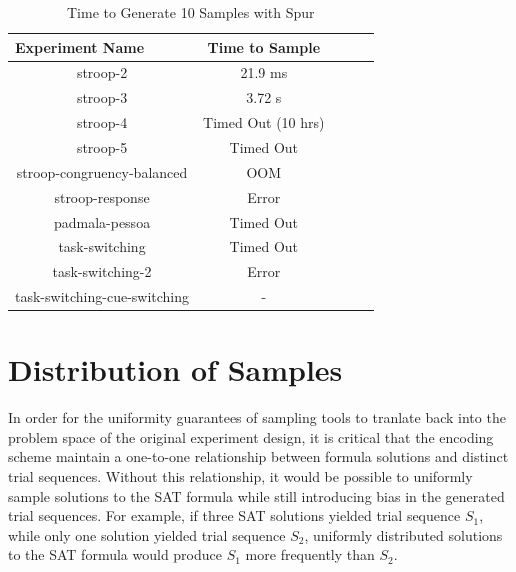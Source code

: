 

\begin{table}
  \centering
  \caption{Time to Generate 10 Samples with Spur}
\begin{tabular}{|c|c|c|c|c|}
\hline
\multicolumn{1}{|l|}{Experiment Name} & Time to Sample                \\ \hline
stroop-2                              & 21.9 ms                       \\ \hline
stroop-3                              & 3.72 s                        \\ \hline
stroop-4                              & Timed Out (10 hrs)            \\ \hline
stroop-5                              & Timed Out                     \\ \hline
stroop-congruency-balanced            & OOM                           \\ \hline  %
stroop-response                       & Error                         \\ \hline  %
padmala-pessoa                        & Timed Out                     \\ \hline  %
task-switching                        & Timed Out                     \\ \hline  %
task-switching-2                      & Error                         \\ \hline  %
task-switching-cue-switching          & -                             \\ \hline  %
\end{tabular}
\label{tab:benchmark_experiments_spur}%
\end{table}


\section{Distribution of Samples}

In order for the uniformity guarantees of sampling tools to tranlate back into the problem space of the original experiment design, it is critical that the encoding scheme maintain a one-to-one relationship between formula solutions and distinct trial sequences. Without this relationship, it would be possible to uniformly sample solutions to the SAT formula while still introducing bias in the generated trial sequences. For example, if three SAT solutions yielded trial sequence $S_1$, while only one solution yielded trial sequence $S_2$, uniformly distributed solutions to the SAT formula would produce $S_1$ more frequently than $S_2$.


